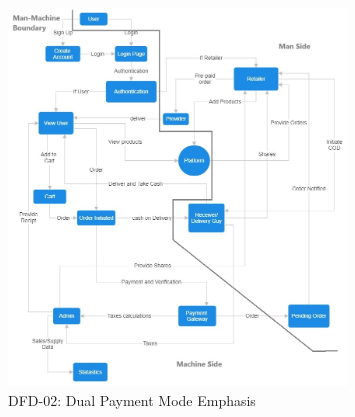 \documentclass[a4paper,12pt]{article}
\begin{document}
\begin{figure}[H]
    \centering
    \includegraphics[width=0.8\textwidth]{dfd2.jpg}
    \caption{DFD-02: Dual Payment Mode Emphasis}
\end{figure}
\end{document}
